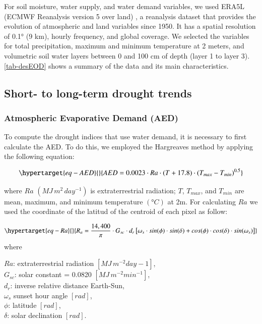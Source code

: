 \documentclass[
  authoryear,
  preprint,
  3p,
  onecolumn]{elsarticle}
\begin{document}
For soil moisture, water supply, and water demand variables, we used
ERA5L (ECMWF Reanalysis version 5 over land) \citep{MunozSabater2021}, a
reanalysis dataset that provides the evolution of atmospheric and land
variables since 1950. It has a spatial resolution of 0.1° (9 km), hourly
frequency, and global coverage. We selected the variables for total
precipitation, maximum and minimum temperature at 2 meters, and
volumetric soil water layers between 0 and 100 cm of depth (layer 1 to
layer 3). \ref{tab-desEOD} shows a summary of the data and its main
characteristics.

\hypertarget{short--to-long-term-drought-trends}{%
\subsection{Short- to long-term drought
trends}\label{short--to-long-term-drought-trends}}

\hypertarget{atmospheric-evaporative-demand-aed}{%
\subsubsection{Atmospheric Evaporative Demand
(AED)}\label{atmospheric-evaporative-demand-aed}}

To compute the drought indices that use water demand, it is necessary to
first calculate the AED. To do this, we employed the Hargreaves method
\citep{Hargreaves1994, Hargreaves1985} by applying the following
equation:

\begin{equation}\protect\hypertarget{eq-AED}{}{AED = 0.0023\cdot Ra\cdot (T+17.8)\cdot (T_{max}-T_{min})^{0.5}}\label{eq-AED}\end{equation}

where \(Ra\) \((MJ\,m^2\, day^{-1})\) is extraterrestrial radiation;
\(T\), \(T_{max}\), and \(T_{min}\) are mean, maximum, and minimum
temperature \((°C)\) at 2m. For calculating \(Ra\) we used the
coordinate of the latitud of the centroid of each pixel as follow:

\begin{equation}\protect\hypertarget{eq-Ra}{}{R_a = \frac{14,400}{\pi}\cdot G_{sc}\cdot d_r \left[\omega_s\cdot sin(\phi)\cdot sin(\delta)+cos(\phi)\cdot cos(\delta)\cdot sin(\omega_s) \right]}\label{eq-Ra}\end{equation}
where

\(Ra\): extraterrestrial radiation \([MJ\, m^{-2} day-1]\),\\
\(G_{sc}\): solar constant = 0.0820 \([MJ\,m^{-2} min^{-1}]\),\\
\(d_r\): inverse relative distance Earth-Sun,\\
\(\omega_s\) sunset hour angle \([rad]\),\\
\(\phi\): latitude \([rad]\),\\
\(\delta\): solar declination \([rad]\).
\end{document}
